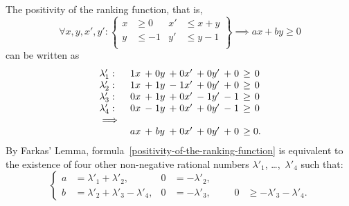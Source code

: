 \documentclass{acm_proc_article-sp}
\newcommand{\itc}{\mathrel{:}}
\begin{document}
The positivity of the ranking function, that is,
\begin{equation}
\label{positivity-of-the-ranking-function}
  \forall x, y, x', y' \itc
    \left\{
      \begin{aligned}
        x  &\ge 0  & x' &\le x+y \\
        y  &\le -1 & y' &\le y-1 \\
      \end{aligned}
    \right\}
  \implies
    ax + by \ge 0
\end{equation}
can be written as
\[
  \begin{array}{lc@{\hspace{1ex}}c@{\;}c@{\hspace{1ex}}c@{\;}c@{\hspace{1ex}}c@{\;}c@{\hspace{1ex}}c@{\;}c@{\hspace{1ex}}c@{\;}c@{\hspace{1ex}}}
    \lambda'_1: & 1x & + & 0y & + & 0x' & + & 0y' & + & 0 & \ge & 0 \\
    \lambda'_2: & 1x & + & 1y & - & 1x' & + & 0y' & + & 0 & \ge & 0 \\
    \lambda'_3: & 0x & + & 1y & + & 0x' & - & 1y' & - & 1 & \ge & 0 \\
    \lambda'_4: & 0x & - & 1y & + & 0x' & + & 0y' & - & 1 & \ge & 0 \\
    \implies \\
                & ax & + & by & + & 0x' & + & 0y' & + & 0 & \ge & 0.
\end{array} \]
By Farkas' Lemma, formula~\eqref{positivity-of-the-ranking-function}
is equivalent to the existence of four other non-negative rational numbers
$\lambda'_1$, \dots,~$\lambda'_4$ such that:
\begin{equation}
\label{fnlinpos}
  \left\{
    \begin{aligned}
      a &= \lambda'_1 + \lambda'_2,
                                         & 0 &=   -\lambda'_2, \\
      b &= \lambda'_2 + \lambda'_3 - \lambda'_4,
                                         & 0 &=   -\lambda'_3, &
        &
                                         & 0 &\ge -\lambda'_3 - \lambda'_4.
    \end{aligned}
  \right.
\end{equation}
\end{document}
